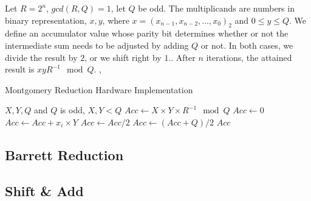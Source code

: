 \documentclass[11pt,
  titlepage=false,
  abstract=on,
]{scrreprt}
\begin{document}
Let $R=2^n$, $gcd(R, Q)=1$, let $Q$ be odd. The multiplicands are numbers in binary representation, $x, y$, where $x = (x_{n-1}, x_{n-2},...,x_{0})_2$ and $0 \leq y \leq Q$. 
We define an accumulator value whose parity bit determines whether or not the intermediate sum needs to be adjusted by adding $Q$ or not. In both cases, we divide the result by
$2$, or we shift right by $1.$. After $n$ iterations, the attained result is $xyR^{-1} \mod Q$. \cite{montgomery1985modular}, \cite{7219961}

\begin{algorithm}
  \caption{Montgomery Reduction Hardware Implementation}
  \label{alg:montgomery}
  \begin{algorithmic}[1]
  \REQUIRE \( X, Y, Q \) and \( Q \) is odd, \( X, Y < Q \)
  \renewcommand{\algorithmicensure}{\textbf{Output:}}
  \ENSURE \( Acc \leftarrow X \times Y \times R^{-1} \mod Q \)
  \STATE \( Acc \leftarrow 0 \)
      \STATE \( Acc \leftarrow Acc + x_i \times Y \)
          \STATE \( Acc \leftarrow Acc / 2 \)
      \ELSE
          \STATE \( Acc \leftarrow (Acc + Q) / 2 \)
      \ENDIF
  \ENDFOR
  \RETURN \( Acc \)
  \end{algorithmic}
  \end{algorithm}




\subsection{Barrett Reduction}
\subsection{Shift \& Add}
\end{document}
